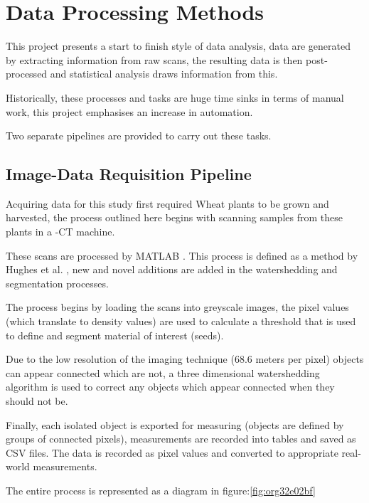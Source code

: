 \documentclass[11pt]{report}
\begin{document}
\section{Data Processing Methods}
\label{sec:org613ac65}
This project presents a start to finish style of data analysis, data are generated by extracting information from raw scans, the resulting data is then post-processed and statistical analysis draws information from this.

Historically, these processes and tasks are huge time sinks in terms of manual work, this project emphasises an increase in automation.

Two separate pipelines are provided to carry out these tasks.

\subsection{Image-Data Requisition Pipeline}
\label{sec:org9ebb484}

Acquiring data for this study first required Wheat plants to be grown and harvested, the process outlined here begins with scanning samples from these plants in a \textmu{}-CT machine.

These scans are processed by MATLAB \cite{MATHWORKS2017}. This process is defined as a method by Hughes et al. \cite{Hughes2017}, new and novel additions are added in the watershedding and segmentation processes.

The process begins by loading the scans into greyscale images, the pixel values (which translate to density values) are used to calculate a threshold that is used to define and segment material of interest (seeds).

Due to the low resolution of the imaging technique (68.6\textmu{} meters per pixel) objects can appear connected which are not, a three dimensional watershedding algorithm is used to correct any objects which appear connected when they should not be.

Finally, each isolated object is exported for measuring (objects are defined by groups of connected pixels), measurements are recorded into tables and saved as CSV files. The data is recorded as pixel values and converted to appropriate real-world measurements.

The entire process is represented as a diagram in figure:\ref{fig:org32e02bf}
\end{document}
